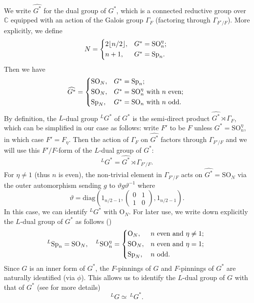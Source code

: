 \documentclass[12pt,oneside,reqno]{amsart}
\newcommand{\C}{\mathbb{C}}
\theoremstyle{plain}
\begin{document}
	
	We write $\widehat{G^\ast}$ for the dual group of $G^\ast$, which is a connected reductive group over $\C$ equipped with an action of the Galois group $\Gamma_{F}$ (factoring through $\Gamma_{F^\circ/F}$). More explicitly,
	we define
	\begin{equation}\label{N}
		N
		=
		\begin{cases*}
			2\lfloor n/2\rfloor,
			& $G^\ast=\mathrm{SO}_n^\eta$;
			\\
			n+1,
			&
			$G^\ast=\mathrm{Sp}_n$.
		\end{cases*}
	\end{equation}
	Then we have
	\[
	\widehat{G^\ast}
	=
	\begin{cases*}
		\mathrm{SO}_N,
		&
		$G^\ast=\mathrm{Sp}_n$;
		\\
		\mathrm{SO}_N,
		&
		$G^\ast=\mathrm{SO}_n^\eta$ with $n$ even;
		\\
		\mathrm{Sp}_N,
		&
		$G^\ast=\mathrm{SO}_n$ with $n$ odd.
	\end{cases*}
	\]
	By definition, the $L$-dual group $^LG^\ast$ of $G^\ast$ is the semi-direct product $\widehat{G^\ast}\rtimes\Gamma_{F}$, which can be simplified in our case as follows: write $F'$ to be $F$ unless $G^\ast=\mathrm{SO}_n^\eta$, in which case $F'=F_\eta$. Then the action of $\Gamma_{F}$ on $\widehat{G^\ast}$ factors through $\Gamma_{F'/F}$ and we will use this $F'/F$-form of the $L$-dual group of $G^\ast$:
	\[
	^LG^\ast=\widehat{G^\ast}\rtimes\Gamma_{F'/F}.
	\]
	For $\eta\neq1$ (thus $n$ is even), the non-trivial element in $\Gamma_{F'/F}$ acts on $\widehat{G^\ast}=\mathrm{SO}_N$ via the outer automorphism sending $g$ to $\vartheta g\vartheta^{-1}$ where
	\[
	\vartheta
	=
	\mathrm{diag}
	\left(
	1_{n/2-1},
	\begin{pmatrix}
		0 & 1 \\ 1 & 0
	\end{pmatrix},
	1_{n/2-1}
	\right).
	\]
	In this case, we can identify $^LG^\ast$ with $\mathrm{O}_N$. For later use, we write down explicitly the $L$-dual group of $G^\ast$ as follows (\cite[§2.1]{Shin2024})
	\[
	^L\mathrm{Sp}_n
	=
	\mathrm{SO}_N,
	\quad
	^L\mathrm{SO}_n^\eta
	=
	\begin{cases*}
		\mathrm{O}_N,
		&
		$n$ even and $\eta\neq1$;
		\\
		\mathrm{SO}_N,
		&
		$n$ even and $\eta=1$;
		\\
		\mathrm{Sp}_N,
		&
		$n$ odd.
	\end{cases*}
	\]
	Since $G$ is an inner form of $G^\ast$, the $F$-pinnings of $G$ and $F$-pinnings of $G^\ast$ are naturally identified (via $\phi$). This allows us to identify the $L$-dual group of $G$ with that of $G^\ast$ (see \cite[§1.4]{Shin2024} for more details)
	\[
	^LG\simeq\,^LG^\ast.
	\]
	
\end{document}
